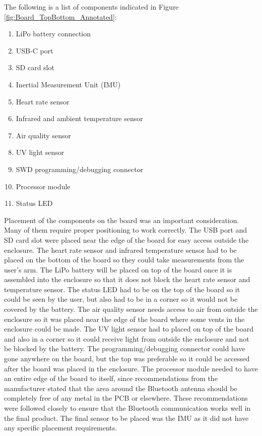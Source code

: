 The following is a list of components indicated in Figure \ref{fig:Board_TopBottom_Annotated}: 
\begin{enumerate}
   \item LiPo battery connection
   \item USB-C port
   \item SD card slot 
   \item Inertial Measurement Unit (IMU)
   \item Heart rate sensor
   \item Infrared and ambient temperature sensor
   \item Air quality sensor
   \item UV light sensor
   \item SWD programming/debugging connector
   \item Processor module
   \item Status LED
\end{enumerate}

Placement of the components on the board was an important consideration. Many 
of them require proper positioning to work correctly. The USB port and SD card 
slot were placed near the edge of the board for easy access outside the 
enclosure. The heart rate sensor and infrared temperature sensor had to be 
placed on the bottom of the board so they could take measurements from the 
user’s arm. The LiPo battery will be placed on top of the board once it is 
assembled into the enclosure so that it does not block the heart rate sensor 
and temperature sensor. The status LED had to be on the top of the board so it 
could be seen by the user, but also had to be in a corner so it would not be 
covered by the battery. The air quality sensor needs access to air from outside 
the enclosure so it was placed near the edge of the board where some vents in 
the enclosure could be made. The UV light sensor had to placed on top of the 
board and also in a corner so it could receive light from outside the enclosure 
and not be blocked by the battery. The programming/debugging connector could 
have gone anywhere on the board, but the top was preferable so it could 
be accessed after the board was placed in the enclosure. The processor
module needed to have an entire edge of the board to itself, since 
recommendations from the manufacturer stated that the area around the Bluetooth 
antenna should be completely free of any metal in the PCB or elsewhere. These 
recommendations were followed closely to ensure that the Bluetooth 
communication works well in the final product. The final sensor to be placed 
was the IMU as it did not have any specific placement requirements.
